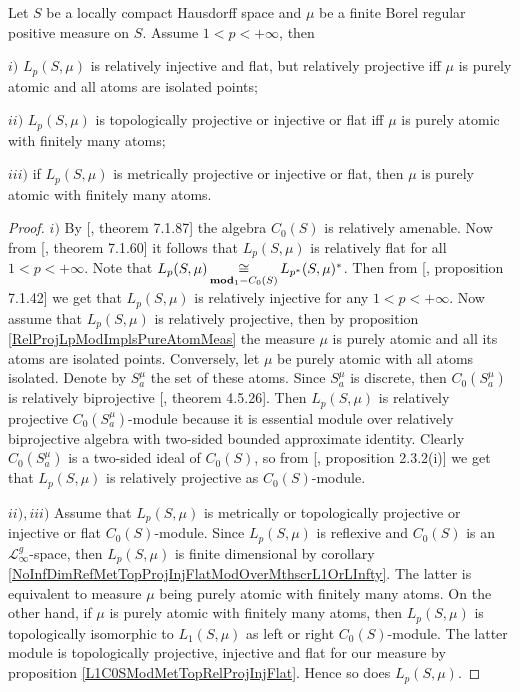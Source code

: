 \begin{proposition}\label{LpC0SModMetTopRelProjIngFlat}
Let $S$ be a locally compact Hausdorff space and $\mu$ be a finite Borel regular positive measure on $S$. Assume $1<p<+\infty$, then 

$i)$ $L_p(S,\mu)$ is relatively injective and flat, but relatively projective iff $\mu$ is purely atomic and all atoms are isolated points;

$ii)$ $L_p(S,\mu)$ is topologically projective or injective or flat iff $\mu$ is purely atomic with finitely many atoms;

$iii)$ if $L_p(S,\mu)$ is metrically projective or injective or flat, then $\mu$ is purely atomic with finitely many atoms.
\end{proposition}
\begin{proof} $i)$ By [\cite{HelBanLocConvAlg}, theorem 7.1.87] the algebra $C_0(S)$ is relatively amenable. Now from [\cite{HelBanLocConvAlg}, theorem 7.1.60] it follows that $L_p(S,\mu)$ is relatively flat for all $1<p<+\infty$. Note that $L_p(S,\mu)\mathop{\mathbin{\cong}}\limits_{\mathbf{mod}_1-C_0(S)}L_{p^*}(S,\mu)^*$. Then from [\cite{HelBanLocConvAlg}, proposition 7.1.42] we get that $L_p(S,\mu)$ is relatively injective for any $1<p<+\infty$. Now assume that $L_p(S,\mu)$ is relatively projective, then by proposition \ref{RelProjLpModImplsPureAtomMeas} the measure $\mu$ is purely atomic and all its atoms are isolated points. Conversely, let $\mu$ be purely atomic with all atoms isolated. Denote by $S_a^{\mu}$ the set of these atoms. Since $S_a^{\mu}$ is discrete, then $C_0(S_a^{\mu})$ is relatively biprojective [\cite{HelHomolBanTopAlg}, theorem 4.5.26]. Then $L_p(S,\mu)$ is relatively projective $C_0(S_a^{\mu})$-module because it is essential module over relatively biprojective algebra with two-sided bounded approximate identity. Clearly $C_0(S_a^{\mu})$ is a two-sided ideal of $C_0(S)$, so from [\cite{RamsHomPropSemgroupAlg}, proposition 2.3.2(i)] we get that $L_p(S,\mu)$ is relatively projective as $C_0(S)$-module.

$ii), iii)$ Assume that $L_p(S,\mu)$ is metrically or topologically projective or injective or flat $C_0(S)$-module. Since $L_p(S,\mu)$ is reflexive and $C_0(S)$ is an $\mathscr{L}_\infty^g$-space, then $L_p(S,\mu)$ is finite dimensional by corollary \ref{NoInfDimRefMetTopProjInjFlatModOverMthscrL1OrLInfty}. The latter is equivalent to measure $\mu$ being purely atomic with finitely many atoms. On the other hand, if $\mu$ is purely atomic with finitely many atoms, then $L_p(S,\mu)$ is topologically isomorphic to $L_1(S,\mu)$ as left or right $C_0(S)$-module. The latter module is topologically projective, injective and flat for our measure by proposition \ref{L1C0SModMetTopRelProjInjFlat}. Hence so does $L_p(S,\mu)$.
\end{proof}

